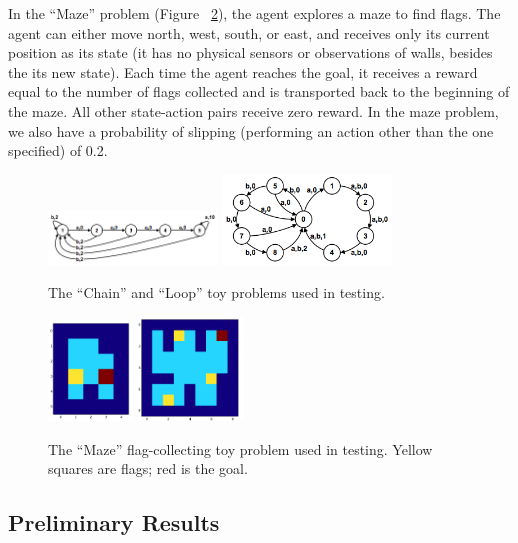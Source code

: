 \documentclass[10pt, twocolumn, twoside]{article}
\begin{document}
In the ``Maze'' problem (Figure ~\ref{fig:maze}), the agent explores a maze to find
flags. The agent can either move north, west, south, or east, and receives only its
current position as its state (it has no physical sensors or observations of walls,
besides the its new state). Each time the agent reaches the goal, it receives a reward
equal to the number of flags collected and is transported back to the beginning of the
maze. All other state-action pairs receive zero reward. In the maze problem, we also
have a probability of slipping (performing an action other than the
one specified) of 0.2.

\begin{figure}
\centering
\includegraphics[width=0.4\textwidth]{chain.png}
\includegraphics[width=0.4\textwidth]{loop.png}
\caption{\label{fig:chainloop} The ``Chain'' and ``Loop'' toy problems used in testing.}
\end{figure}

\begin{figure}
\centering
\includegraphics[width=0.2\textwidth]{easymaze.png}
\includegraphics[width=0.25\textwidth]{hardmaze.png}
\caption{\label{fig:maze} The ``Maze'' flag-collecting toy problem used in testing.
Yellow squares are flags; red is the goal.}
\end{figure}

\subsection{Preliminary Results}



\end{document}
